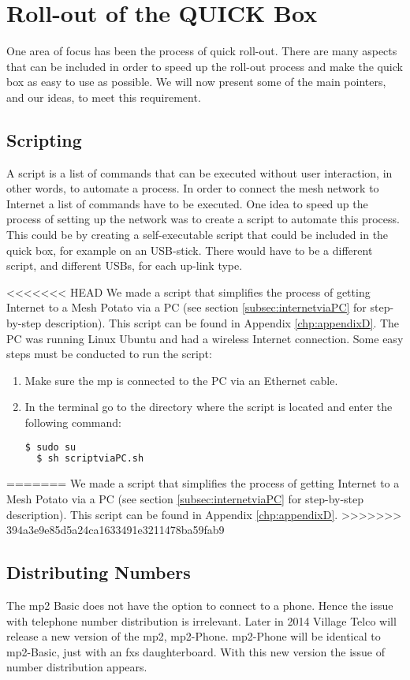 \chapter{Roll-out of the QUICK Box}
\label{chp:manuals} 

One area of focus has been the process of quick roll-out. There are many aspects that can be included in order to speed up the roll-out process and make the \gls{quick} box as easy to use as possible. We will now present some of the main pointers, and our ideas, to meet this requirement.


\section{Scripting}
A script is a list of commands that can be executed without user interaction, in other words, to automate a process. In order to connect the mesh network to Internet a list of commands have to be executed. One idea to speed up the process of setting up the network was to create a script to automate this process. This could be by creating a self-executable script that could be included in the \gls{quick} box, for example on an USB-stick. There would have to be a different script, and different USBs, for each up-link type. 

<<<<<<< HEAD
We made a script that simplifies the process of getting Internet to a Mesh Potato via a PC (see section \ref{subsec:internetviaPC} for step-by-step description). This script can be found in Appendix \ref{chp:appendixD}. The PC was running Linux Ubuntu and had a wireless Internet connection. Some easy steps must be conducted to run the script:
\begin{enumerate}
\item Make sure the \gls{mp} is connected to the PC via an Ethernet cable.
\item In the terminal go to the directory where the script is located and enter the following command:
\noindent
\begin{lstlisting}[language=bash]
  $ sudo su
  $ sh scriptviaPC.sh
\end{lstlisting}
\end{enumerate}
=======
We made a script that simplifies the process of getting Internet to a Mesh Potato via a PC (see section \ref{subsec:internetviaPC} for step-by-step description). This script can be found in Appendix \ref{chp:appendixD}. 
>>>>>>> 394a3e9e85d5a24ca1633491e3211478ba59fab9

\section{Distributing Numbers}
The \gls{mp2} Basic does not have the option to connect to a phone. Hence the issue with telephone number distribution is irrelevant. Later in 2014 Village Telco will release a new version of the \gls{mp2}, \gls{mp2}-Phone. \gls{mp2}-Phone will be identical to \gls{mp2}-Basic, just with an \gls{fxs} daughterboard. With this new version the issue of number distribution appears. 

